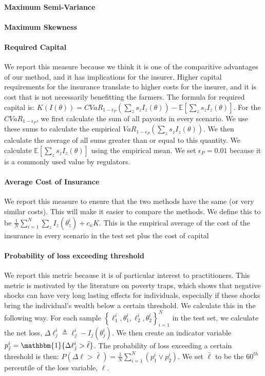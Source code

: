 \documentclass[11pt]{article}
\begin{document}
   \paragraph*{Maximum Semi-Variance}

   \paragraph*{Maximum Skewness}

   \paragraph*{Required Capital} We report this measure because we think it is one of the comparitive advantages of our method, and it has implications for the insurer. Higher capital requirements for the insurance translate to higher costs for the insurer, and it is cost that is not necessarily benefitting the farmers. The formula for required capital is: $K(I(\theta)) = CVaR_{1-\epsilon_P}(\sum_z s_z I_z(\theta)) - \mathbb{E}[\sum_z s_z I_z(\theta)]$. For the $CVaR_{1-\epsilon_P}$, we first calculate the sum of all payouts in every scenario. We use these sums to calculate the empirical $VaR_{1-\epsilon_P}(\sum_z s_z I_z(\theta))$. We then calculate the average of all sums greater than or equal to this quantity. We calculate $\mathbb{E}[\sum_z s_z I_z(\theta)]$ using the empirical mean. We set $\epsilon_P = 0.01$ because it is a commonly used value by regulators. 

   \paragraph*{Average Cost of Insurance} We report this measure to ensure that the two methods have the same (or very similar costs). This will make it easier to compare the methods. We define this to be $\frac{1}{N}\sum_{i=1}^N \sum_z I_z(\theta^i_z) + c_{\kappa} K$. This is the empirical average of the cost of the insurance in every scenario in the test set plus the cost of capital

   \paragraph*{Probability of loss exceeding threshold} We report this metric because it is of particular interest to practitioners. This metric is motivated by the literature on poverty traps, which shows that negative shocks can have very long lasting effects for individuals, especially if these shocks bring the individual's wealth below a certain threshold. We calculate this in the following way. For each sample $\left \{\ell^i_1,\theta^i_1, \ell^i_2, \theta^i_2 \right \}_{i=1}^N$ in the test set, we calculate the net loss, $\Delta \ell_j^i \triangleq  \ell^i_j - I_j(\theta^i_j)$. We then create an indicator variable $p^i_j =  \mathbbm{1}\{ \Delta \ell^i_j > \bar{\ell} \}$. The probability of loss exceeding a certain threshold is then: $P(\Delta \ell > \bar{\ell}) = \frac{1}{N}\sum_{i=1}^N (p^i_1 \lor p^i_2)$. We set $\bar{\ell}$ to be the $60^{th}$ percentile of the loss variable, $\ell$.
\end{document}

